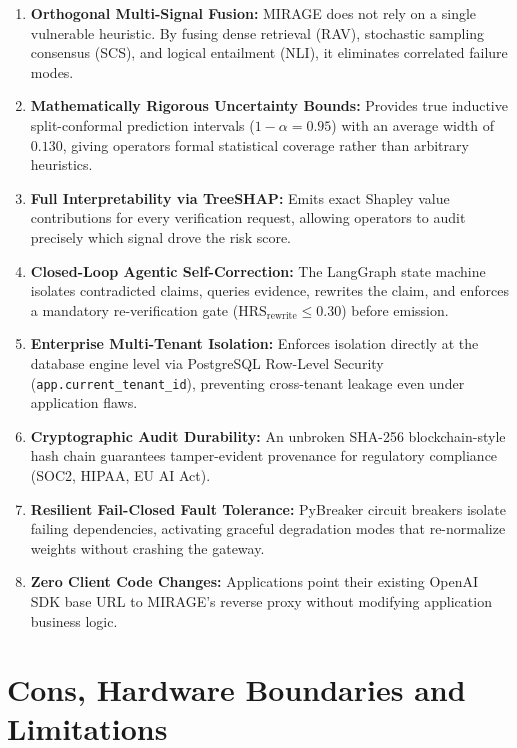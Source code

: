 \documentclass[11pt,a4paper]{article}
\begin{document}
\begin{enumerate}[leftmargin=*]
    \item \textbf{Orthogonal Multi-Signal Fusion:} MIRAGE does not rely on a single vulnerable heuristic. By fusing dense retrieval (RAV), stochastic sampling consensus (SCS), and logical entailment (NLI), it eliminates correlated failure modes.
    \item \textbf{Mathematically Rigorous Uncertainty Bounds:} Provides true inductive split-conformal prediction intervals ($1-\alpha=0.95$) with an average width of $0.130$, giving operators formal statistical coverage rather than arbitrary heuristics.
    \item \textbf{Full Interpretability via TreeSHAP:} Emits exact Shapley value contributions for every verification request, allowing operators to audit precisely which signal drove the risk score.
    \item \textbf{Closed-Loop Agentic Self-Correction:} The LangGraph state machine isolates contradicted claims, queries evidence, rewrites the claim, and enforces a mandatory re-verification gate ($\text{HRS}_{\text{rewrite}} \le 0.30$) before emission.
    \item \textbf{Enterprise Multi-Tenant Isolation:} Enforces isolation directly at the database engine level via PostgreSQL Row-Level Security (\texttt{app.current\_tenant\_id}), preventing cross-tenant leakage even under application flaws.
    \item \textbf{Cryptographic Audit Durability:} An unbroken SHA-256 blockchain-style hash chain guarantees tamper-evident provenance for regulatory compliance (SOC2, HIPAA, EU AI Act).
    \item \textbf{Resilient Fail-Closed Fault Tolerance:} PyBreaker circuit breakers isolate failing dependencies, activating graceful degradation modes that re-normalize weights without crashing the gateway.
    \item \textbf{Zero Client Code Changes:} Applications point their existing OpenAI SDK base URL to MIRAGE's reverse proxy without modifying application business logic.
\end{enumerate}

\section{Cons, Hardware Boundaries and Limitations}
\end{document}
